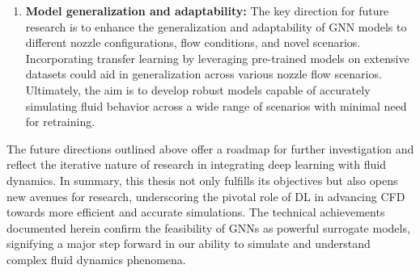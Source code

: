 \begin{enumerate}
    \item \textbf{Model generalization and adaptability:} 
    The key direction for future research is to enhance the generalization and adaptability of GNN models to different nozzle configurations, flow conditions, and novel scenarios. Incorporating transfer learning by leveraging pre-trained models on extensive datasets could aid in generalization across various nozzle flow scenarios. Ultimately, the aim is to develop robust models capable of accurately simulating fluid behavior across a wide range of scenarios with minimal need for retraining. 
    
\end{enumerate}
The future directions outlined above offer a roadmap for further investigation and reflect the iterative nature of research in integrating deep learning with fluid dynamics. In summary, this thesis not only fulfills its objectives but also opens new avenues for research, underscoring the pivotal role of DL in advancing CFD towards more efficient and accurate simulations. The technical achievements documented herein confirm the feasibility of GNNs as powerful surrogate models, signifying a major step forward in our ability to simulate and understand complex fluid dynamics phenomena.



